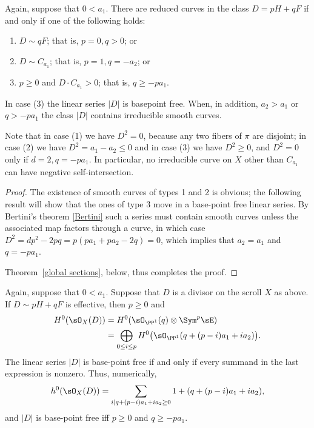 \begin{theorem}\label{where are the curves?} Again, suppose that $0<a_{1}$.
There are reduced  curves in the class $D = pH+qF$ if and only if one of the following holds:

\begin{enumerate}
\item $D\sim qF$; that is, $p=0, q>0$; or
\item $D\sim C_{a_{1}}$; that is, $p=1, q=-a_{2}$; or
\item $p\geq 0$ and $D\cdot C_{a_{1}}> 0$; that is, $q \geq -pa_1.$
\end{enumerate}
In case (3) the linear series $|D|$ is basepoint free. When, in addition, $a_2>a_1$ or $q>-pa_1$ the class $|D|$ contains irreducible smooth curves.
\end{theorem}

Note that in case (1) we have $D^{2} = 0$, because any two fibers of $\pi$ are disjoint; in case (2) we have $D^{2}= a_{1}-a_{2}\leq 0$ and in case (3) we have $D^{2}\geq 0$, and $D^2=0$ only if
$d=2, q = -pa_1$. In particular, no irreducible curve
on $X$ other than $C_{a_1}$ can have negative self-intersection.

\begin{proof}
The existence of smooth curves of types 1 and 2 is obvious; the following result will show that
the ones of type 3 move in a base-point free linear series. By Bertini's theorem \ref{Bertini} such a series must contain smooth curves unless the associated map factors through a curve, in which case $D^2 = dp^2-2pq = p(pa_1+pa_2 -2 q) = 0$, which implies that $a_2=a_1$ and $q= -pa_1$.

Theorem~\ref{global sections}, below, thus completes the proof.
\end{proof}

\begin{theorem}\label{global sections} Again, suppose that $0<a_{1}$.
Suppose that $D$ is a divisor on the scroll $X$ as above. If $D \sim pH+qF$ is effective,  then $p\geq 0$ and
\begin{align*}
 H^{0}(\sO_{X}(D)) &= H^{0}(\sO_{\PP^{1}}(q) \otimes \Sym^{p} \sE)\\
 &= 
\bigoplus_{0\leq i\leq p}H^{0}\bigl(\sO_{\PP^{1}}(q + (p-i)a_{1}+i a_{2})\bigr).
\end{align*}
The linear series $|D|$ is base-point free if and only if every summand in the last expression is nonzero.
Thus, numerically,
$$
h^{0}(\sO_{X}(D)) = 
\sum_{i \mid q+(p-i)a_{1}+i a_{2} \geq 0}1+(q + (p-i)a_{1}+i a_{2}),
$$
and
$|D|$ is base-point free iff $p\geq 0$ and $q\geq -pa_{1}$.
\end{theorem}

